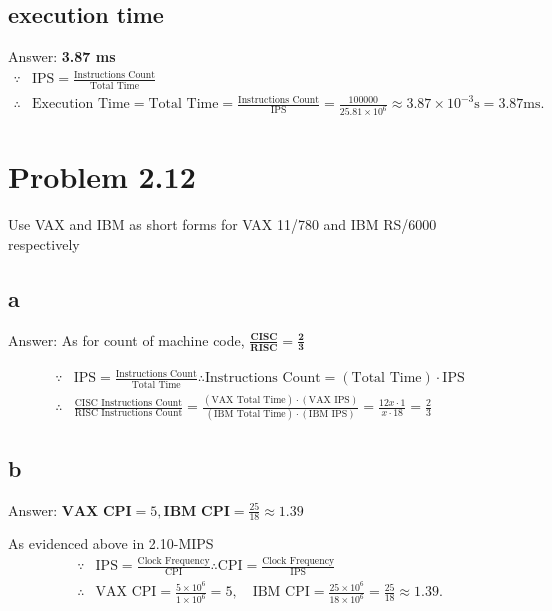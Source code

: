 \documentclass[11pt]{article}  %
\begin{document}
\subsection*{execution time}
    Answer: \textbf{3.87 ms}
    $$
    \begin{aligned}
        \because & \text{IPS} = \frac{\text{Instructions Count}}{\text{Total Time}} \\
        \therefore &\text{Execution Time} = \text{Total Time} = \frac{\text{Instructions Count}}{\text{IPS}} = 
            \frac{100000}{25.81 \times 10^6} \approx 3.87\times 10^{-3}\text{s} = 3.87\text{ms}.
    \end{aligned}
    $$

\section*{Problem 2.12}
    Use VAX and IBM as short forms for VAX 11/780 and IBM RS/6000 respectively
\subsection*{a}
    Answer: As for count of machine code, 
    $\displaystyle \mathbf{\frac{\textbf{CISC}}{\textbf{RISC}} = \frac{2}{3}}$

    $$
    \begin{aligned}
        \because  &\text{IPS} = \frac{\text{Instructions Count}}{\text{Total Time}} 
        \therefore \text{Instructions Count} = \left(\text{Total Time}\right) \cdot \text{IPS}\\
        \therefore &\frac{\text{CISC Instructions Count}}{\text{RISC Instructions Count}} = 
            \frac{\left(\text{VAX Total Time}\right) \cdot \left(\text{VAX IPS}\right)}
            {\left(\text{IBM Total Time}\right) \cdot \left(\text{IBM IPS}\right)}
            = \frac{12x\cdot 1}{x \cdot 18} = \frac{2}{3} 
    \end{aligned}
    $$

\subsection*{b}
    Answer: $\displaystyle \textbf{VAX CPI} = 5, \textbf{IBM CPI} = \frac{25}{18} \approx 1.39$

    As evidenced above in 2.10-MIPS
    $$
    \begin{aligned}
        \because & \text{IPS} = \frac{\text{Clock Frequency}}{\text{CPI}}
        \therefore \text{CPI} = \frac{\text{Clock Frequency}}{\text{IPS}} \\ 
        \therefore &\text{VAX CPI} = \frac{5\times 10^6}{1\times 10^6} = 5, \quad
        \text{IBM CPI} = \frac{25\times 10^6}{18\times 10^6} = \frac{25}{18} \approx 1.39. 
    \end{aligned}
    $$
\end{document}
